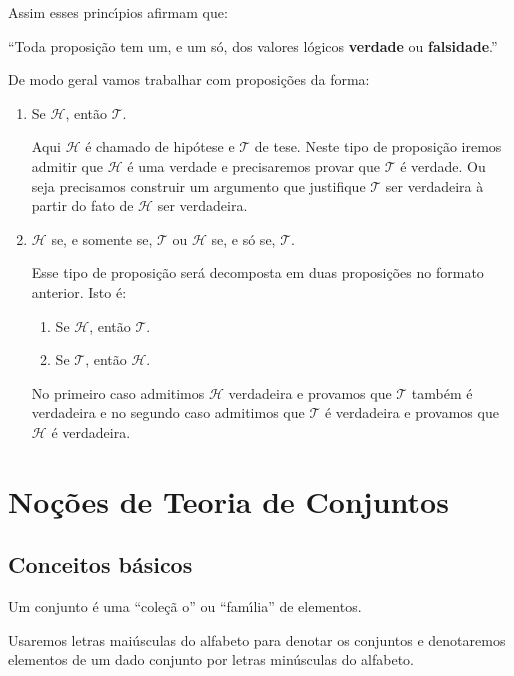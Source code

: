 Assim esses princ{\'\i}pios afirmam que:
\begin{center}
	``Toda proposi\c{c}\~ao tem um, e um s\'o, dos valores l\'ogicos \textbf{verdade} ou \textbf{falsidade}.''
\end{center}

De modo geral vamos trabalhar com proposi\c{c}\~oes da forma:
\begin{enumerate}
	\item Se $\mathcal{H}$, ent\~ao $\mathcal{T}$.

	Aqui $\mathcal{H}$ \'e chamado de hip\'otese e $\mathcal{T}$ de tese. Neste tipo de proposi\c{c}\~ao iremos admitir que $\mathcal{H}$ \'e uma verdade e precisaremos provar que $\mathcal{T}$ \'e verdade. Ou seja precisamos construir um argumento que justifique $\mathcal{T}$ ser verdadeira \`a partir do fato de $\mathcal{H}$ ser verdadeira.

	\item $\mathcal{H}$ se, e somente se, $\mathcal{T}$ ou $\mathcal{H}$ se, e s\'o se, $\mathcal{T}$.

	Esse tipo de proposi\c{c}\~ao ser\'a decomposta em duas proposi\c{c}\~oes no formato anterior. Isto \'e:
	\begin{enumerate}
		\item Se $\mathcal{H}$, ent\~ao $\mathcal{T}$.
		\item Se $\mathcal{T}$, ent\~ao $\mathcal{H}$.
	\end{enumerate}

	No primeiro caso admitimos $\mathcal{H}$ verdadeira e provamos que $\mathcal{T}$ tamb\'em \'e verdadeira e no segundo caso admitimos que $\mathcal{T}$ \'e verdadeira e provamos que $\mathcal{H}$ \'e verdadeira.
\end{enumerate}


\chapter{No{\c c}{\~o}es de Teoria de Conjuntos}
\section{Conceitos b{\'a}sicos}

Um conjunto {\'e} uma ``cole{\c c}{\~a} o'' ou ``fam{\'\i}lia'' de elementos.

Usaremos letras mai{\'u}sculas do alfabeto para denotar os conjuntos e denotaremos elementos de um dado conjunto por letras min{\'u}sculas do alfabeto.

